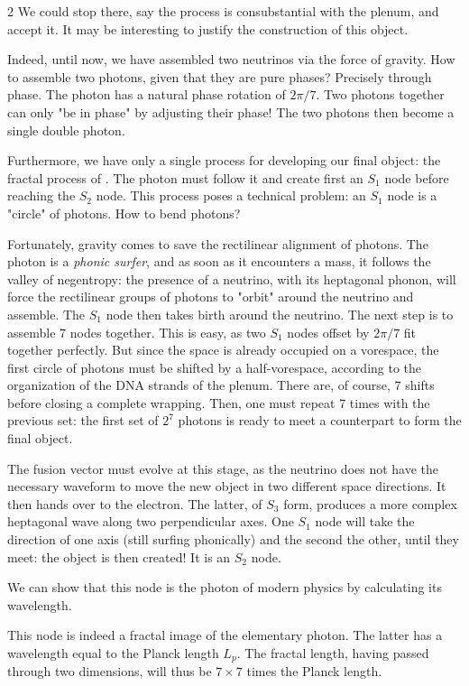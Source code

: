 \begin{multicols}{2}
	We could stop there, say the process is consubstantial with the plenum, and accept it. It may be interesting to justify the construction of this object.
	
	Indeed, until now, we have assembled two neutrinos via the force of gravity. How to assemble two photons, given that they are pure phases? Precisely through phase. The photon has a natural phase rotation of $2\pi/7$. Two photons together can only "be in phase" by adjusting their phase! The two photons then become a single double photon.
	
	Furthermore, we have only a single process for developing our final object: the fractal process of \PQ. The photon must follow it and create first an $S_1$ node before reaching the $S_2$ node. This process poses a technical problem: an $S_1$ node is a "circle" of photons. How to bend photons?
	
	Fortunately, gravity comes to save the rectilinear alignment of photons. The photon is a \textit{phonic surfer}, and as soon as it encounters a mass, it follows the valley of negentropy: the presence of a neutrino, with its heptagonal phonon, will force the rectilinear groups of photons to "orbit" around the neutrino and assemble. The $S_1$ node then takes birth around the neutrino. The next step is to assemble 7 nodes together. This is easy, as two $S_1$ nodes offset by $2\pi/7$ fit together perfectly. But since the space is already occupied on a vorespace, the first circle of photons must be shifted by a half-vorespace, according to the organization of the DNA strands of the plenum. There are, of course, 7 shifts before closing a complete wrapping. Then, one must repeat 7 times with the previous set: the first set of $2^7$ photons is ready to meet a counterpart to form the final object.
	
	The fusion vector must evolve at this stage, as the neutrino does not have the necessary waveform to move the new object in two different space directions. It then hands over to the electron. The latter, of $S_3$ form, produces a more complex heptagonal wave along two perpendicular axes. One $S_1$ node will take the direction of one axis (still surfing phonically) and the second the other, until they meet: the object is then created! It is an $S_2$ node.
	\medskip
	
	We can show that this node is the photon of modern physics by calculating its wavelength.
	
	This node is indeed a fractal image of the elementary photon. The latter has a wavelength equal to the Planck length $L_p$. The fractal length, having passed through two dimensions, will thus be $7\times 7$ times the Planck length.
	

\end{multicols}

